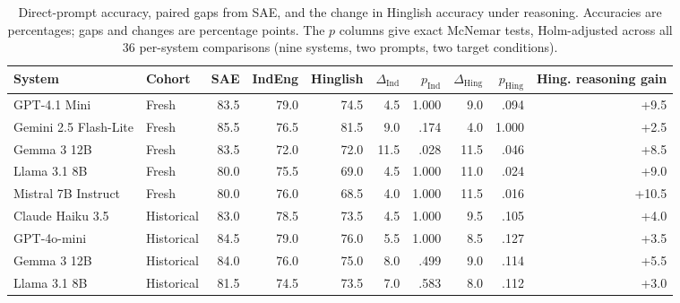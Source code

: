 \begin{table}[t]
\centering
\caption{Direct-prompt accuracy, paired gaps from SAE, and the change in Hinglish accuracy under reasoning. Accuracies are percentages; gaps and changes are percentage points. The $p$ columns give exact McNemar tests, Holm-adjusted across all 36 per-system comparisons (nine systems, two prompts, two target conditions).}
\label{tab:accuracy-main}
\small
\setlength{\tabcolsep}{4pt}
\begin{tabular}{llrrrrrrrr}
\toprule
System & Cohort & SAE & IndEng & Hinglish & $\Delta_{\mathrm{Ind}}$ & $p_{\mathrm{Ind}}$ & $\Delta_{\mathrm{Hing}}$ & $p_{\mathrm{Hing}}$ & Hing. reasoning gain \\
\midrule
GPT-4.1 Mini & Fresh & 83.5 & 79.0 & 74.5 & 4.5 & 1.000 & 9.0 & .094 & +9.5 \\
Gemini 2.5 Flash-Lite & Fresh & 85.5 & 76.5 & 81.5 & 9.0 & .174 & 4.0 & 1.000 & +2.5 \\
Gemma 3 12B & Fresh & 83.5 & 72.0 & 72.0 & 11.5 & .028 & 11.5 & .046 & +8.5 \\
Llama 3.1 8B & Fresh & 80.0 & 75.5 & 69.0 & 4.5 & 1.000 & 11.0 & .024 & +9.0 \\
Mistral 7B Instruct & Fresh & 80.0 & 76.0 & 68.5 & 4.0 & 1.000 & 11.5 & .016 & +10.5 \\
\addlinespace
Claude Haiku 3.5 & Historical & 83.0 & 78.5 & 73.5 & 4.5 & 1.000 & 9.5 & .105 & +4.0 \\
GPT-4o-mini & Historical & 84.5 & 79.0 & 76.0 & 5.5 & 1.000 & 8.5 & .127 & +3.5 \\
Gemma 3 12B & Historical & 84.0 & 76.0 & 75.0 & 8.0 & .499 & 9.0 & .114 & +5.5 \\
Llama 3.1 8B & Historical & 81.5 & 74.5 & 73.5 & 7.0 & .583 & 8.0 & .112 & +3.0 \\
\bottomrule
\end{tabular}
\end{table}
